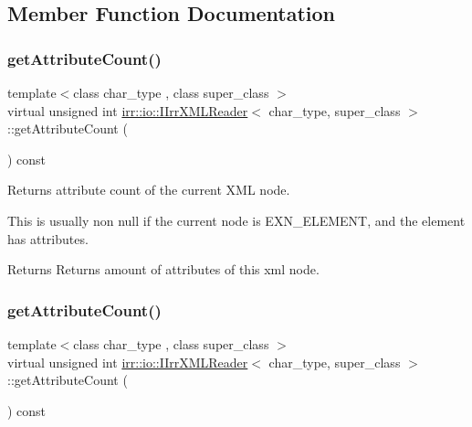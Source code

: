 \subsection{Member Function Documentation}
\mbox{\label{classirr_1_1io_1_1IIrrXMLReader_a8f85253d2efb15061facdb9571b9c549}} 
\subsubsection{\texorpdfstring{get\+Attribute\+Count()}{getAttributeCount()}\hspace{0.1cm}{\footnotesize\ttfamily [1/2]}}
{\footnotesize\ttfamily template$<$class char\+\_\+type , class super\+\_\+class $>$ \\
virtual unsigned int \hyperlink{classirr_1_1io_1_1IIrrXMLReader}{irr\+::io\+::\+I\+Irr\+X\+M\+L\+Reader}$<$ char\+\_\+type, super\+\_\+class $>$\+::get\+Attribute\+Count (\begin{DoxyParamCaption}{ }\end{DoxyParamCaption}) const\hspace{0.3cm}{\ttfamily [pure virtual]}}



Returns attribute count of the current X\+ML node. 

This is usually non null if the current node is E\+X\+N\+\_\+\+E\+L\+E\+M\+E\+NT, and the element has attributes. \begin{DoxyReturn}{Returns}
Returns amount of attributes of this xml node. 
\end{DoxyReturn}
\mbox{\label{classirr_1_1io_1_1IIrrXMLReader_a8f85253d2efb15061facdb9571b9c549}} 
\subsubsection{\texorpdfstring{get\+Attribute\+Count()}{getAttributeCount()}\hspace{0.1cm}{\footnotesize\ttfamily [2/2]}}
{\footnotesize\ttfamily template$<$class char\+\_\+type , class super\+\_\+class $>$ \\
virtual unsigned int \hyperlink{classirr_1_1io_1_1IIrrXMLReader}{irr\+::io\+::\+I\+Irr\+X\+M\+L\+Reader}$<$ char\+\_\+type, super\+\_\+class $>$\+::get\+Attribute\+Count (\begin{DoxyParamCaption}{ }\end{DoxyParamCaption}) const\hspace{0.3cm}{\ttfamily [pure virtual]}}



